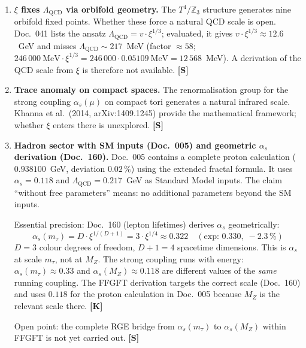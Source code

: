 \begin{enumerate}
  \item \textbf{$\xi$ fixes $\Lambda_{\mathrm{QCD}}$ via orbifold
    geometry.} The $T^4/\mathbb{Z}_3$ structure generates nine orbifold
    fixed points. Whether these force a natural QCD scale is open.
    Doc.~041 lists the ansatz
    $\Lambda_{\mathrm{QCD}} = v \cdot \xi^{1/3}$; evaluated, it gives
    $v \cdot \xi^{1/3} \approx 12.6$~GeV and misses
    $\Lambda_{\mathrm{QCD}} \sim 217$~MeV (factor $\approx 58$;
    $246\,000~\mathrm{MeV} \cdot \xi^{1/3} = 246\,000 \cdot
    0.05109~\mathrm{MeV} = 12\,568$~MeV). A derivation
    of the QCD scale from $\xi$ is therefore not available. \textbf{[S]}

  \item \textbf{Trace anomaly on compact spaces.} The renormalisation
    group for the strong coupling $\alpha_s(\mu)$ on compact tori
    generates a natural infrared scale. Khanna et al.\ (2014,
    arXiv:1409.1245) provide the mathematical framework; whether $\xi$
    enters there is unexplored. \textbf{[S]}

  \item \textbf{Hadron sector with SM inputs (Doc.~005) and
    geometric $\alpha_s$ derivation (Doc.~160).}
    Doc.~005 contains a complete proton calculation
    ($0.938100$~GeV, deviation $0.02\,\%$) using the extended fractal
    formula. It uses $\alpha_s = 0.118$ and
    $\Lambda_{\mathrm{QCD}} = 0.217$~GeV as Standard Model inputs.
    The claim ``without free parameters'' means: no additional
    parameters beyond the SM inputs.

    Essential precision:
    Doc.~160 (lepton lifetimes) derives $\alpha_s$ geometrically:
    \begin{equation}
      \alpha_s(m_\tau) = D \cdot \xi^{1/(D+1)} = 3 \cdot \xi^{1/4}
      \approx 0.322 \quad (\text{exp: }0.330,\; -2.3\,\%)
    \end{equation}
    $D = 3$ colour degrees of freedom, $D+1 = 4$ spacetime dimensions.
    This is $\alpha_s$ at scale $m_\tau$, not at $M_Z$.
    The strong coupling runs with energy: $\alpha_s(m_\tau)
    \approx 0.33$ and $\alpha_s(M_Z) \approx 0.118$ are
    different values of the \emph{same} running coupling.
    The FFGFT derivation targets the correct scale (Doc.~160)
    and uses $0.118$ for the proton calculation in Doc.~005
    because $M_Z$ is the relevant scale there. \textbf{[K]}

    Open point: the complete RGE bridge from
    $\alpha_s(m_\tau)$ to $\alpha_s(M_Z)$ within FFGFT
    is not yet carried out. \textbf{[S]}
\end{enumerate}

